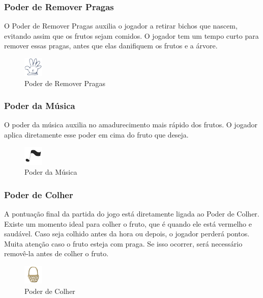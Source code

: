 \documentclass[12pt]{article}
\begin{document}
 \subsubsection{Poder de Remover Pragas}
 O Poder de Remover Pragas auxilia o jogador a retirar bichos que nascem, evitando assim
 que os frutos sejam comidos. O jogador tem um tempo curto para remover essas pragas, antes que
 elas danifiquem os frutos e a \'arvore.

	\begin{figure}[ht!]
	\begin{center}
		\includegraphics[scale=1.1]{img/icone_luva.png}
		\footnotesize \caption{Poder de Remover Pragas }
	\end{center}
	\end{figure}	
 
 \subsubsection{Poder da M\'usica}
 O poder da m\'usica auxilia no amadurecimento mais r\'apido dos frutos. O jogador aplica diretamente esse poder em cima
 do fruto que deseja.
 
	\begin{figure}[ht!]
	\begin{center}
		\includegraphics[scale=1.1]{img/icone_nota_musical.png}
		\footnotesize \caption{Poder da M\'usica}
	\end{center}
	\end{figure}	

 \subsubsection{Poder de Colher}
 A pontua\c c\~ao final da partida do jogo est\'a diretamente ligada ao Poder de Colher. Existe um momento ideal para colher o
 fruto, que \'e quando ele est\'a vermelho e saud\'avel. Caso seja colhido antes da hora ou depois, o jogador perder\'a
 pontos. Muita aten\c c\~ao caso o fruto esteja com praga. Se isso ocorrer, ser\'a necess\'ario remov\^e-la antes de
 colher o fruto.
 
	\begin{figure}[ht!]
	\begin{center}
		\includegraphics[scale=1.1]{img/icone_cesta.png}
		\footnotesize \caption{Poder de Colher}
	\end{center}
	\end{figure}	
\end{document}
